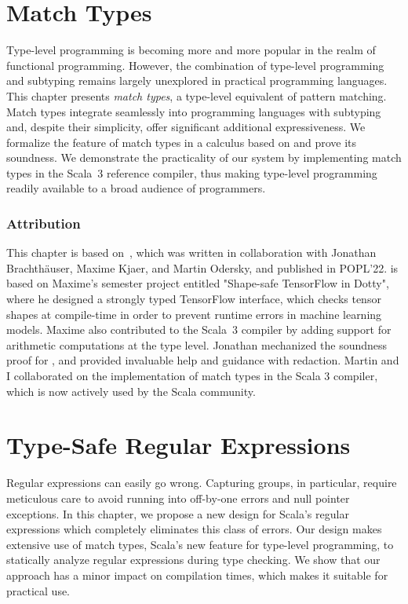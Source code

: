 

\chapter{Match Types}
\label{chap:match-types}

Type-level programming is becoming more and more popular in the realm of functional programming.
However, the combination of type-level programming and subtyping remains largely unexplored in practical programming languages.
This chapter presents \emph{match types}, a type-level equivalent of pattern matching.
Match types integrate seamlessly into programming languages with subtyping and, despite their simplicity, offer significant additional expressiveness.
We formalize the feature of match types in a calculus based on \SystemFsub and prove its soundness.
We demonstrate the practicality of our system by implementing match types in the Scala~3 reference compiler, thus making type-level programming readily available to a broad audience of programmers.

\subsection*{Attribution}

This chapter is based on~\citep{blanvillain2022type}, which was written in collaboration with Jonathan Brachthäuser, Maxime Kjaer, and Martin Odersky, and published in POPL'22.
 is based on Maxime's semester project entitled "Shape-safe TensorFlow in Dotty", where he designed a strongly typed TensorFlow interface, which checks tensor shapes at compile-time in order to prevent runtime errors in machine learning models.
Maxime also contributed to the Scala~3 compiler by adding support for arithmetic computations at the type level.
Jonathan mechanized the soundness proof for \SystemFm, and provided invaluable help and guidance with redaction.
Martin and I collaborated on the implementation of match types in the Scala 3 compiler, which is now actively used by the Scala community.



\chapter{Type-Safe Regular Expressions}
\label{chap:type-safe-regular-expressions}

Regular expressions can easily go wrong.
Capturing groups, in particular, require meticulous care to avoid running into off-by-one errors and null pointer exceptions.
In this chapter, we propose a new design for Scala's regular expressions which completely eliminates this class of errors.
Our design makes extensive use of match types, Scala's new feature for type-level programming, to statically analyze regular expressions during type checking.
We show that our approach has a minor impact on compilation times, which makes it suitable for practical use.

